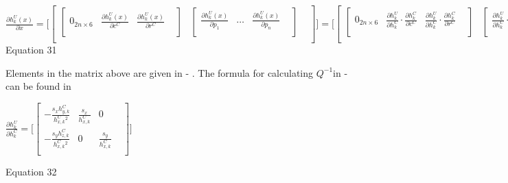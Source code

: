 $\frac{\partial h_{k}^{U}(x)}{\partial x}=\lbrack \begin{bmatrix}
\begin{bmatrix}
0_{2n\times 6} & \frac{\partial h_{k}^{U}(x)}{\partial c^{C}} & 
\frac{\partial h_{k}^{U}(x)}{\partial r^{C}} & \\
\end{bmatrix}
 & \begin{bmatrix}
\frac{\partial h_{k}^{U}(x)}{\partial p_{1}} & \ldots & \frac{\partial 
h_{k}^{U}(x)}{\partial p_{n}} & \\
\end{bmatrix}
 & \\
\end{bmatrix}
\rbrack =\lbrack \begin{bmatrix}
\begin{bmatrix}
0_{2n\times 6} & \frac{\partial h_{k}^{U}}{\partial h_{k}^{C}}\cdot 
\frac{\partial h_{k}^{C}}{\partial c^{C}} & \frac{\partial 
h_{k}^{U}}{\partial h_{k}^{C}}\cdot \frac{\partial h_{k}^{C}}{\partial 
r^{C}} & \\
\end{bmatrix}
 & \begin{bmatrix}
\frac{\partial h_{k}^{U}}{\partial h_{k}^{C}}\cdot \frac{\partial 
h_{k}^{C}}{\partial p_{1}} & \ldots & \frac{\partial h_{k}^{U}}{\partial 
h_{k}^{C}}\cdot \frac{\partial h_{k}^{C}}{\partial p_{n}} & \\
\end{bmatrix}
 & \\
\end{bmatrix}
\rbrack $\\


Equation 31

Elements in the matrix above are given in - . The formula for 
calculating $Q^{-1}$in - can be found in 

\begin{center}$\frac{\partial h_{k}^{U}}{\partial h_{ k}^{C}}= \lbrack 
\begin{bmatrix}
-\frac{s_{x}h_{y,k}^{C}}{h_{x,k}^{C}^{2}} & \frac{s_{x}}{h_{x,k}^{C}} & 
0 & \\
-\frac{s_{y}h_{z,k}^{C}}{h_{x,k}^{C}^{2}} & 0 & 
\frac{s_{y}}{h_{x,k}^{C}} & \\
\end{bmatrix}
\rbrack $\\
\end{center}

Equation 32



